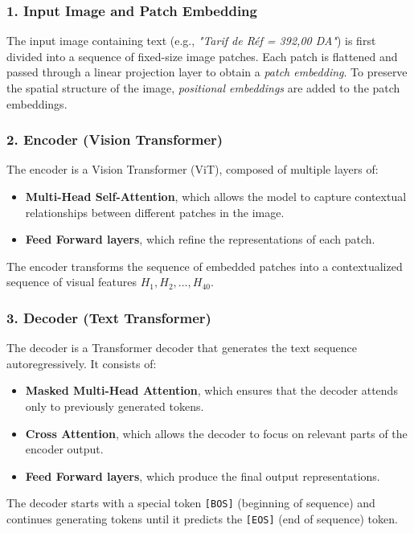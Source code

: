 \subsubsection*{1. Input Image and Patch Embedding}

The input image containing text (e.g., \textit{"Tarif de Réf = 392,00 DA"}) is first divided into a sequence of fixed-size image patches. Each patch is flattened and passed through a linear projection layer to obtain a \textit{patch embedding}. To preserve the spatial structure of the image, \textit{positional embeddings} are added to the patch embeddings.

\subsubsection*{2. Encoder (Vision Transformer)}

The encoder is a Vision Transformer (ViT), composed of multiple layers of:
\begin{itemize}
    \item \textbf{Multi-Head Self-Attention}, which allows the model to capture contextual relationships between different patches in the image.
    \item \textbf{Feed Forward layers}, which refine the representations of each patch.
\end{itemize}

The encoder transforms the sequence of embedded patches into a contextualized sequence of visual features \( H_1, H_2, \dots, H_{40} \).

\subsubsection*{3. Decoder (Text Transformer)}

The decoder is a Transformer decoder that generates the text sequence autoregressively. It consists of:
\begin{itemize}
    \item \textbf{Masked Multi-Head Attention}, which ensures that the decoder attends only to previously generated tokens.
    \item \textbf{Cross Attention}, which allows the decoder to focus on relevant parts of the encoder output.
    \item \textbf{Feed Forward layers}, which produce the final output representations.
\end{itemize}

The decoder starts with a special token \texttt{[BOS]} (beginning of sequence) and continues generating tokens until it predicts the \texttt{[EOS]} (end of sequence) token.

